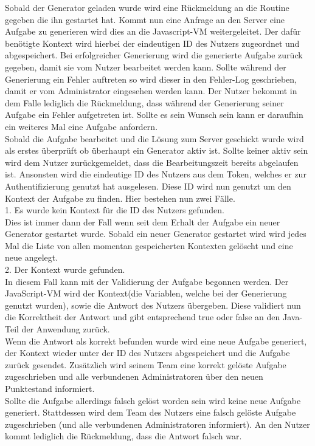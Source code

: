 Sobald der Generator geladen wurde wird eine Rückmeldung an die Routine gegeben die ihn gestartet hat. Kommt nun eine Anfrage an den Server eine Aufgabe zu generieren wird dies an die Javascript-VM weitergeleitet. Der dafür benötigte Kontext wird hierbei der eindeutigen ID des Nutzers zugeordnet und abgespeichert. Bei erfolgreicher Generierung wird die generierte Aufgabe zurück gegeben, damit sie vom Nutzer bearbeitet werden kann. Sollte während der Generierung ein Fehler auftreten so wird dieser in den Fehler-Log geschrieben, damit er vom Administrator eingesehen werden kann. Der Nutzer bekommt in dem Falle lediglich die Rückmeldung, dass während der Generierung seiner Aufgabe ein Fehler aufgetreten ist. Sollte es sein Wunsch sein kann er daraufhin ein weiteres Mal eine Aufgabe anfordern. \\

Sobald die Aufgabe bearbeitet und die Lösung zum Server geschickt wurde wird als erstes überprüft ob überhaupt ein Generator aktiv ist. Sollte keiner aktiv sein wird dem Nutzer zurückgemeldet, dass die Bearbeitungszeit bereits abgelaufen ist. Ansonsten wird die eindeutige ID des Nutzers aus dem Token, welches er zur Authentifizierung genutzt hat ausgelesen. Diese ID wird nun genutzt um den Kontext der Aufgabe zu finden. Hier bestehen nun zwei Fälle. \\

1. Es wurde kein Kontext für die ID des Nutzers gefunden.\\
Dies ist immer dann der Fall wenn seit dem Erhalt der Aufgabe ein neuer Generator gestartet wurde. Sobald ein neuer Generator gestartet wird wird jedes Mal die Liste von allen momentan gespeicherten Kontexten gelöscht und eine neue angelegt. \\

2. Der Kontext wurde gefunden.\\
In diesem Fall kann mit der Validierung der Aufgabe begonnen werden. Der JavaScript-VM wird der Kontext(die Variablen, welche bei der Generierung genutzt wurden), sowie die Antwort des Nutzers übergeben. Diese validiert nun die Korrektheit der Antwort und gibt entsprechend true oder false an den Java-Teil der Anwendung zurück. \\
Wenn die Antwort als korrekt befunden wurde wird eine neue Aufgabe generiert, der Kontext wieder unter der ID des Nutzers abgespeichert und die Aufgabe zurück gesendet. Zusätzlich wird seinem Team eine korrekt gelöste Aufgabe zugeschrieben und alle verbundenen Administratoren über den neuen Punktestand informiert. \\
Sollte die Aufgabe allerdings falsch gelöst worden sein wird keine neue Aufgabe generiert. Stattdessen wird dem Team des Nutzers eine falsch gelöste Aufgabe zugeschrieben (und alle verbundenen Administratoren informiert). An den Nutzer kommt lediglich die Rückmeldung, dass die Antwort falsch war.

